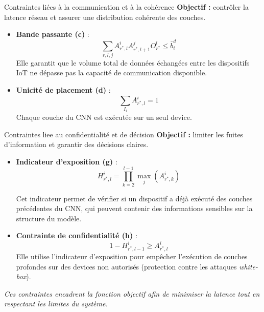 \documentclass[aspectratio=169]{beamer}
\begin{document}
\begin{frame}{Contraintes liées à la communication et à la cohérence}
\textbf{Objectif :} contrôler la latence réseau et assurer une
distribution cohérente des couches.

\vspace{0.3cm}
\begin{itemize}
    \item \textbf{Bande passante (c)} :
    \[
    \sum_{r,l,j}
    A^{i}_{r^*,l} A^{j}_{r^*,l+1}
    O^{l}_{r^*}
    \le \bar{b}^{d}_i
    \]
    \small
    Elle garantit que le volume total de données échangées entre les dispositifs IoT ne dépasse pas la capacité de communication disponible.

    \vspace{0.2cm}
    \item \textbf{Unicité de placement (d)} :
    \[
    \sum_{I_i} A^{i}_{r^*,l} = 1
    \]
    \small
    Chaque couche du CNN est exécutée sur un seul device.

\end{itemize}
\end{frame}

\begin{frame}{Contraintes liee au confidentialité et de décision}
\textbf{Objectif :} limiter les fuites d’information et garantir
des décisions claires.

\vspace{0.3cm}
\begin{itemize}
    \item \textbf{Indicateur d’exposition (g)} :
    \[
    H^{i}_{r^*,l} =
    \prod_{k=2}^{l-1}
    \max_{j} \left( A^{i}_{r^*,k} \right)
    \]
    
    \small
    Cet indicateur permet de vérifier si un dispositif a déjà exécuté des couches précédentes du CNN, qui peuvent contenir des informations sensibles sur la structure du modèle.

    \vspace{0.2cm}
    \item \textbf{Contrainte de confidentialité (h)} :
    \[
    1 - H^{i}_{r^*,l-1} \ge A^{i}_{r^*,l}
    \]
    \small
    Elle utilise l’indicateur d’exposition pour empêcher l’exécution de couches profondes sur des devices non
    autorisés (protection contre les attaques \textit{white-box}).
\end{itemize}

\vspace{0.2cm}
\centering
\textit{Ces contraintes encadrent la fonction objectif afin de
minimiser la latence tout en respectant les limites du système.}
\end{frame}
\end{document}
